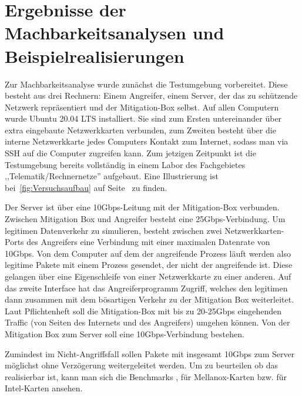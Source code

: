 \documentclass[../review_1.tex]{subfiles}
\begin{document}
\chapter{Ergebnisse der Machbarkeitsanalysen und Beispielrealisierungen}\thispagestyle{fancy}

Zur Machbarkeitsanalyse wurde zunächst die Testumgebung vorbereitet. Diese besteht aus drei Rechnern: Einem Angreifer, einem Server, der das zu schützende Netzwerk repräsentiert und der Mitigation-Box selbst. Auf allen Computern wurde Ubuntu 20.04 LTS installiert. Sie sind zum Ersten untereinander über extra eingebaute Netzwerkkarten verbunden, zum Zweiten besteht über die interne Netzwerkkarte jedes Computers Kontakt zum Internet, sodass man via SSH auf die Computer zugreifen kann. Zum jetzigen Zeitpunkt ist die Testumgebung bereits vollständig in einem Labor des Fachgebietes ,,Telematik/Rechnernetze'' aufgebaut. Eine Illustrierung ist bei~\ref{fig:Versuchsaufbau} auf Seite~\pageref{fig:Versuchsaufbau} zu finden. 

Der Server ist über eine 10Gbps-Leitung mit der Mitigation-Box verbunden. Zwischen Mitigation Box und Angreifer besteht eine 25Gbps-Verbindung. Um legitimen Datenverkehr zu simulieren, besteht zwischen zwei Netzwerkkarten-Ports des Angreifers eine Verbindung mit einer maximalen Datenrate von 10Gbps. Von dem Computer auf dem der angreifende Prozess läuft werden also legitime Pakete mit einem Prozess gesendet, der nicht der angreifende ist. Diese gelangen über eine Eigenschleife von einer Netzwerkkarte zu einer anderen. Auf das zweite Interface hat das Angreiferprogramm Zugriff, welches den legitimen dann zusammen mit dem bösartigen Verkehr zu der Mitigation Box weiterleitet. Laut Pflichtenheft soll die Mitigation-Box mit bis zu 20-25Gbps eingehenden Traffic (von Seiten des Internets und des Angreifers) umgehen können. Von der Mitigation Box zum Server soll eine 10Gbps-Verbindung bestehen.

Zumindest im Nicht-Angriffsfall sollen Pakete mit insgesamt 10Gbps zum Server möglichst ohne Verzögerung weitergeleitet werden. Um zu beurteilen ob das realisierbar ist, kann man sich die Benchmarks \cite{ryzen_benchmarks}, \cite{mellanox_nic_benchmark} für Mellanox-Karten bzw. \cite{intel_nic_benchmark} für Intel-Karten ansehen.

\end{document}
